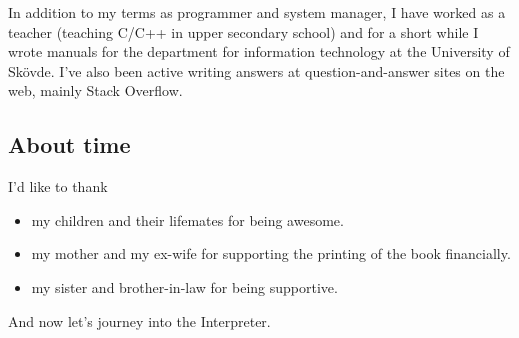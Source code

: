 \documentclass[a5paper,final]{memoir}
\begin{document}
In addition to my terms as programmer and system manager, I have worked as a
teacher (teaching C/C++ in upper secondary school) and for a short while I
wrote manuals for the department for information technology at
the University of Skövde. I've also been active writing answers at
question-and-answer sites on the web, mainly Stack Overflow.

\subsection{About time}
\label{about-time}

I'd like to thank

\begin{itemize}
\item my children and their lifemates for being awesome.

\item my mother and my ex-wife for supporting the printing of the book financially.

\item my sister and brother-in-law for being supportive.
\end{itemize}

\vspace{1in}\noindent And now let's journey into the Interpreter.

\mainmatter
\pagestyle{headings}
\end{document}
